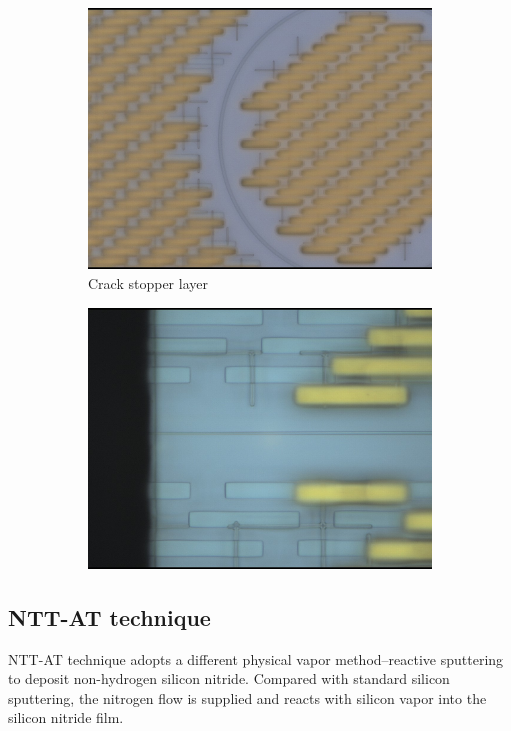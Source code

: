 \begin{figure}
\begin{subfigure}[b]{0.45\textwidth}
		\includegraphics[width=\textwidth]{imgs/jpg/ligentec/cross}
		\caption{Crack stopper layer}
	\end{subfigure}
	\begin{subfigure}[b]{0.45\textwidth}
		\includegraphics[width=\textwidth]{imgs/jpg/ligentec/cov}
		\caption{}
	\end{subfigure}
	\label{fig:ligentec-laser-micro}
\end{figure}
\subsection{NTT-AT technique}

NTT-AT technique adopts a different physical vapor method--reactive sputtering to deposit non-hydrogen silicon nitride. Compared with standard silicon sputtering, the nitrogen flow is supplied and reacts with silicon vapor into the silicon nitride film. 

